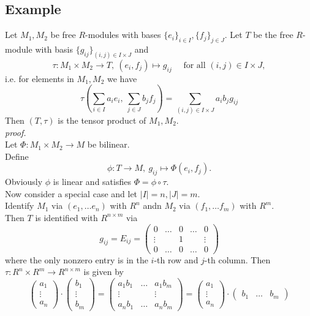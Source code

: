 \documentclass[12pt]{book}
\begin{document}
\begin{spacing}{1.3}
\subsection{Example}%
Let $M_1, M_2$ be free $R$-modules with bases $\{e_i\}_{i \in I}, \{f_j\}_{j \in J}$. Let $T$ be the free $R$-module with basis $\{g_{ij}\}_{(i,j) \in I \times J}$ and $$\tau: M_1 \times M_2 \longrightarrow T, \ (e_i, f_j) \mapsto g_{ij} \quad \textrm{ for all } (i,j) \in I \times J,$$
i.e. for elements in $M_1, M_2$ we have
$$\tau \left(\sum_{i\in I} a_i e_i, \ \sum_{j \in J} b_j f_j \right) = \sum_{(i,j) \in I \times J} a_i b_j g_{ij}$$
Then $(T, \tau)$ is the tensor product of $M_1, M_2$.\\
\textit{proof.}\\
Let $\Phi: M_1 \times M_2 \longrightarrow M$ be bilinear.\\
Define $$\phi: T \longrightarrow M, \ g_{ij} \mapsto \Phi(e_i, f_j).$$
Obviously $\phi$ is linear and satisfies $\Phi=\phi \circ \tau$.\\
Now consider a special case and let $|I|=n, |J|=m$. \\
Identify $M_1$ via $ (e_1, \ldots e_n)$ with $R^n$ andn $M_2$ via $(f_1, \ldots f_m)$ with $R^m$. \\
Then $T$ is identified with $R^{n\times m}$ via
$$g_{ij}=E_{ij}=\begin{pmatrix} 0 & \ldots & 0 & \ldots & 0  \\ \vdots & & 1 & & \vdots \\ 0 & \ldots & 0 & \ldots & 0 \end{pmatrix}$$
where the only nonzero entry is in the $i$-th row and $j$-th column. Then $\tau: R^n \times R^m \longrightarrow R^{n\times m}$ is given by
$$\begin{pmatrix} a_1 \\ \vdots \\ a_n \end{pmatrix} \cdot \begin{pmatrix} b_1 \\ \vdots \\ b_m \end{pmatrix} = \begin{pmatrix} a_1b_1 & \ldots & a_1b_m \\ \vdots & & \vdots \\ a_nb_1 & \ldots & a_nb_m \end{pmatrix} = \begin{pmatrix} a_1 \\ \vdots \\ a_n \end{pmatrix} \cdot \begin{pmatrix} b_1 & \ldots & b_m \end{pmatrix}$$


\end{spacing}
\end{document}
